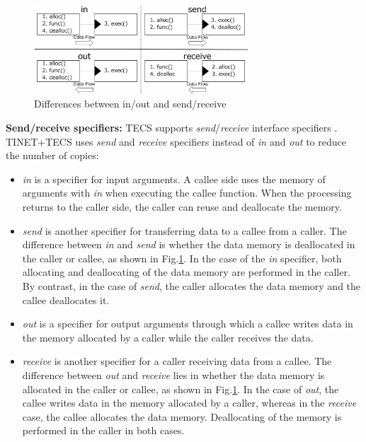 \documentclass[JIP]{ipsj_v2/UTF8/ipsj}
\begin{document}
\begin{figure}[t]
    \centering
    \includegraphics[width=8cm,clip]{figure/SendReceive.pdf}
    \caption{Differences between in/out and send/receive}
    \label{fig:SendReceive}
\end{figure}

{\bf Send/receive specifiers:}
TECS supports {\it send}/{\it receive} interface specifiers \cite{par:RPC}.
TINET+TECS uses {\it send} and {\it receive} specifiers instead of {\it in} and {\it out} to reduce the number of copies:

\begin{itemize}
\item {\it in} is a specifier for input arguments.
A callee side uses the memory of arguments with {\it in} when executing the callee function.
When the processing returns to the caller side, the caller can reuse and deallocate the memory.

\item {\it send} is another specifier for transferring data to a callee from a caller.
The difference between {\it in} and {\it send} is whether the data memory is deallocated in the caller or callee, as shown in Fig.\ref{fig:SendReceive}.
In the case of the {\it in} specifier, both allocating and deallocating of the data memory are performed in the caller.
By contrast, in the case of {\it send}, the caller allocates the data memory and the callee deallocates it.

\item {\it out} is a specifier for output arguments through which a callee writes data in the memory allocated by a caller while the caller receives the data.

\item {\it receive} is another specifier for a caller receiving data from a callee.
The difference between {\it out} and {\it receive} lies in whether the data memory is allocated in the caller or callee, as shown in Fig.\ref{fig:SendReceive}.
In the case of {\it out}, the callee writes data in the memory allocated by a caller, whereas in the {\it receive} case, the callee allocates the data memory.
Deallocating of the memory is performed in the caller in both cases.
\end{itemize}
\end{document}
